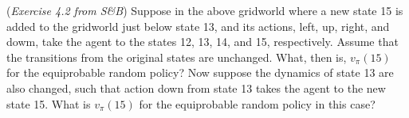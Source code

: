 (\textit{Exercise 4.2 from S\&B})
Suppose in the above gridworld where a new state 15 is added to the gridworld just below state 13, and its actions, left, up, right, and dowm, take the agent
to the states 12, 13, 14, and 15, respectively. Assume that the transitions from
the original states are unchanged. What, then is, $v_\pi(15)$ for the equiprobable random policy? Now suppose the dynamics of state 13 are also changed, such that
action down from state 13 takes the agent to the new state 15. What is $v_\pi(15)$ for the equiprobable random policy in this case?
